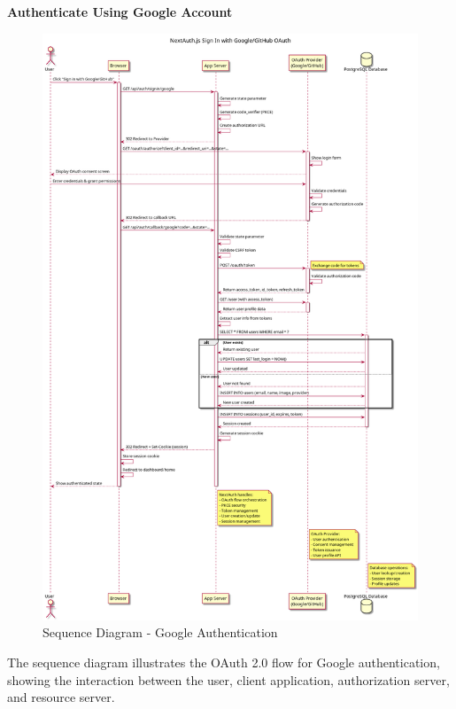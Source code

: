 \textbf{Authenticate Using Google Account}
\begin{figure}[H]
    \centering
    \includegraphics[width=1.0\textwidth]{conception/SprintII/sequence_diagrams/sequence_authentication_1_1_AuthenticateUsingGoogleAccount.png}
    \caption{Sequence Diagram - Google Authentication}
    \label{fig:seq_google_auth}
\end{figure}

The sequence diagram illustrates the OAuth 2.0 flow for Google authentication, showing the interaction between the user, client application, authorization server, and resource server.

